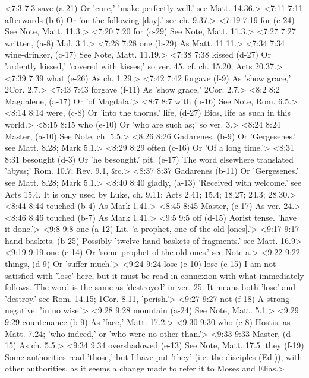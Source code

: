 <7:3 7:3  save (a-21)  Or 'cure,' 'make perfectly well.' see Matt. 14.36.>
<7:11 7:11  afterwards (b-6)  Or 'on the following [day].' see ch. 9.37.>
<7:19 7:19  for (c-24) See Note, Matt. 11.3.>
<7:20 7:20  for (c-29)  See Note, Matt. 11.3.>
<7:27 7:27  written, (a-8)  Mal. 3.1.>
<7:28 7:28  one (b-29)  As Matt. 11.11.>
<7:34 7:34  wine-drinker, (c-17)  See Note, Matt. 11.19.>
<7:38 7:38  kissed (d-27)  Or 'ardently kissed,' 'covered with kisses;' so ver. 45. cf.  ch. 15.20; Acts 20.37.>
<7:39 7:39  what (e-26)  As ch. 1.29.>
<7:42 7:42  forgave (f-9) As 'show grace,' 2Cor. 2.7.>
<7:43 7:43  forgave (f-11)  As 'show grace,' 2Cor. 2.7.>
<8:2 8:2  Magdalene, (a-17)  Or 'of Magdala.'>
<8:7 8:7  with (b-16)  See Note, Rom. 6.5.>
<8:14 8:14  were, (c-8)  Or 'into the thorns.'
  life, (d-27)  Bios, life as such in this world.>
<8:15 8:15  who (e-10)  Or 'who are such as;' so ver. 3.>
<8:24 8:24  Master, (a-10)  See Note. ch. 5.5.>
<8:26 8:26  Gadarenes, (b-9)  Or 'Gergesenes.' see Matt. 8.28; Mark 5.1.>
<8:29 8:29  often (c-16)  Or 'Of a long time.'>
<8:31 8:31  besought (d-3)  Or 'he besought.'
  pit. (e-17)  The word elsewhere translated 'abyss;' Rom. 10.7; Rev. 9.1,  &c.>
<8:37 8:37  Gadarenes (b-11)  Or 'Gergesenes.' see Matt. 8.28; Mark 5.1.>
<8:40 8:40  gladly, (a-13)  'Received with welcome.' see Acts 15.4. It is only used by  Luke, ch. 9.11; Acts 2.41; 15.4; 18.27; 24.3; 28.30.>
<8:44 8:44  touched (b-4) As Mark 1.41.>
<8:45 8:45  Master, (c-17)  As ver. 24.>
<8:46 8:46  touched (b-7)  As Mark 1.41.>
<9:5 9:5  off (d-15)  Aorist tense. 'have it done.'>
<9:8 9:8  one (a-12)  Lit. 'a prophet, one of the old [ones].'>
<9:17 9:17  hand-baskets. (b-25)  Possibly 'twelve hand-baskets of fragments.' see Matt. 16.9>
<9:19 9:19  one (c-14)  Or 'some prophet of the old ones.' see Note a.>
<9:22 9:22  things, (d-9)  Or 'suffer much.'>
<9:24 9:24  lose (e-10)  lose (e-15)
  I am not satisfied with 'lose' here, but it must be read in  connexion with what immediately follows. The word is the same  as 'destroyed' in ver. 25. It means both 'lose' and 'destroy.'  see Rom. 14.15; 1Cor. 8.11, 'perish.'>
<9:27 9:27  not (f-18)  A strong negative. 'in no wise.'>
<9:28 9:28  mountain (a-24)  See Note, Matt. 5.1.>
<9:29 9:29  countenance (b-9)  As 'face,' Matt. 17.2.>
<9:30 9:30  who (c-8)  Hostis. as Matt. 7.24; 'who indeed,' or 'who were no other  than.'>
<9:33 9:33  Master, (d-15)  As ch. 5.5.>
<9:34 9:34  overshadowed (e-13)  See Note, Matt. 17.5.
  they (f-19)  Some authorities read 'those,' but I have put 'they' (i.e.  the disciples (Ed.)), with other authorities, as it seems a  change made to refer it to Moses and Elias.>
